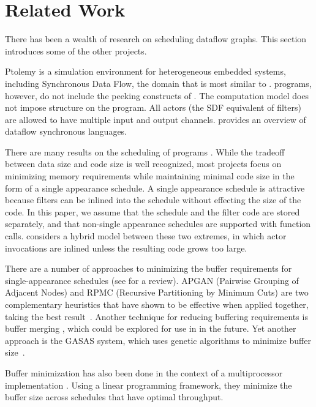 \documentclass{sig-alt-full}
\begin{document}
\section{Related Work}
\label{chpt:related}

There has been a wealth of research on scheduling dataflow graphs.
This section introduces some of the other projects.

Ptolemy \cite{ptolemyoverview} is a simulation environment for
heterogeneous embedded systems, including Synchronous Data Flow, the
domain that is most similar to {\StreamIt}. {\SDF} programs, however,
do not include the peeking constructs of {\StreamIt}.  The {\SDF}
computation model does not impose structure on the program.  All
actors (the SDF equivalent of filters) are allowed to have multiple
input and output channels.  \cite{benveniste93dataflow} provides an
overview of dataflow synchronous languages.

There are many results on the scheduling of {\SDF} programs
\cite{bhattacharyya99synthesis,leesdf}.  While the tradeoff between
data size and code size is well recognized, most projects focus on
minimizing memory requirements while maintaining minimal code size in
the form of a single appearance schedule.  A single appearance
schedule is attractive because filters can be inlined into the
schedule without effecting the size of the code.  In this paper, we
assume that the schedule and the filter code are stored separately,
and that non-single appearance schedules are supported with function
calls. \cite{bhat1999x1} considers a hybrid model between these two
extremes, in which actor invocations are inlined unless the resulting
code grows too large.

There are a number of approaches to minimizing the buffer requirements
for single-appearance schedules (see \cite{bhattacharyya99synthesis}
for a review).  APGAN (Pairwise Grouping of Adjacent Nodes) and RPMC
(Recursive Partitioning by Minimum Cuts) are two complementary
heuristics that have shown to be effective when applied together,
taking the best result~\cite{Bhatta97}.  Another technique for
reducing buffering requirements is buffer merging
\cite{murt1999x3,murt2000x2}, which could be explored for use in
{\StreamIt} in the future.  Yet another approach is the GASAS system,
which uses genetic algorithms to minimize buffer size~\cite{GASAS}.

Buffer minimization has also been done in the context of a
multiprocessor implementation \cite{govindarajan-minimizing}. Using a
linear programming framework, they minimize the buffer size across
schedules that have optimal throughput.
\end{document}
